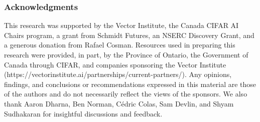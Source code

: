\newpage


\newpage


\subsubsection*{Acknowledgments}
This research was supported by the Vector Institute, the Canada CIFAR AI Chairs program, a grant from Schmidt Futures, an NSERC Discovery Grant, and a generous donation from Rafael Cosman. Resources used in preparing this research were provided, in part, by the Province of Ontario, the Government of Canada through CIFAR, and companies sponsoring the Vector Institute (https://vectorinstitute.ai/partnerships/current-partners/). Any opinions, findings, and conclusions or recommendations expressed in this material are those of the authors and do not necessarily reflect the views of the sponsors. We also thank Aaron Dharna, Ben Norman, Cédric Colas, Sam Devlin, and Shyam Sudhakaran for insightful discussions and feedback.
